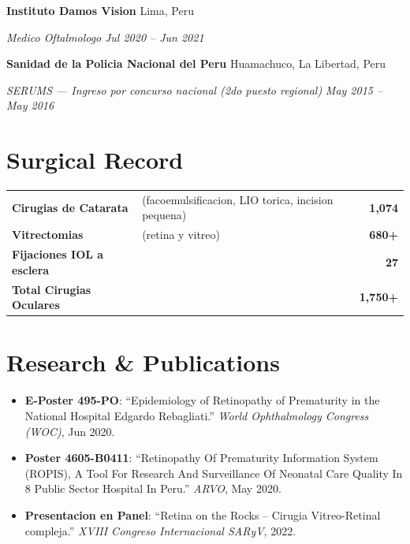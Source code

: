 \documentclass[11pt,letterpaper]{article}
\newcommand{\entry}[4]{%
  \noindent\textbf{#1} \hfill #2 \par\nopagebreak
  \textit{#3} \hfill \textit{#4} \par\nopagebreak
}
\begin{document}
\entry{Instituto Damos Vision}{Lima, Peru}{Medico Oftalmologo}{Jul 2020 -- Jun 2021}
\vspace{0.3em}

\entry{Sanidad de la Policia Nacional del Peru}{Huamachuco, La Libertad, Peru}{SERUMS --- Ingreso por concurso nacional (2do puesto regional)}{May 2015 -- May 2016}
\vspace{0.3em}

\section{Surgical Record}

\begin{tabularx}{\textwidth}{@{}l X r@{}}
\textbf{Cirugias de Catarata} & (facoemulsificacion, LIO torica, incision pequena) & \textbf{1,074} \\
\textbf{Vitrectomias} & (retina y vitreo) & \textbf{680+} \\
\textbf{Fijaciones IOL a esclera} & & \textbf{27} \\
\hline
\textbf{Total Cirugias Oculares} & & \textbf{1,750+} \\
\end{tabularx}

\section{Research \& Publications}

\begin{itemize}
  \item \textbf{E-Poster 495-PO}: ``Epidemiology of Retinopathy of Prematurity in the National Hospital Edgardo Rebagliati.'' \textit{World Ophthalmology Congress (WOC)}, Jun 2020.
  \item \textbf{Poster 4605-B0411}: ``Retinopathy Of Prematurity Information System (ROPIS), A Tool For Research And Surveillance Of Neonatal Care Quality In 8 Public Sector Hospital In Peru.'' \textit{ARVO}, May 2020.
  \item \textbf{Presentacion en Panel}: ``Retina on the Rocks -- Cirugia Vitreo-Retinal compleja.'' \textit{XVIII Congreso Internacional SARyV}, 2022.
\end{itemize}

\end{document}
